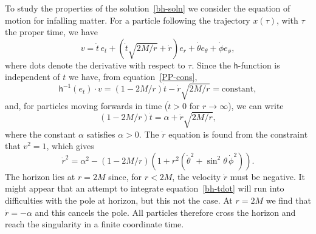 \documentclass[a4paper]{article}
\numberwithin{equation}{section}
\newcommand{\dt}{\! \cdot \!}
\newcommand{\rdot}{\dot{r}}
\newcommand{\tdot}{\dot{t}}
\newcommand{\thetadot}{\dot{\theta}}
\newcommand{\phidot}{\dot{\phi}}
\newcommand{\lih}{\mathsf{h}}
\newcommand{\hu}{\lih}
\begin{document}
To study the properties of the solution~\eqref{bh-soln} we consider the
equation of motion for infalling matter.  For a particle following the
trajectory $x(\tau)$, with $\tau$ the proper time, we have
%
\begin{equation}
v = \tdot \, e_t + (\tdot \sqrt{2M/r} + \rdot) e_r + \thetadot
e_\theta + \phidot e_\phi,
\end{equation}
%
where dots denote the derivative with respect to $\tau$.  Since the
$\lih$-function is independent of $t$ we have, from
equation~\eqref{PP-cons},
%
\begin{equation}
\hu^{-1}(e_t) \dt v = (1-2M/r) \tdot - \rdot \sqrt{2M/r} =
\mbox{constant} ,
\end{equation} 
%
and, for particles moving forwards in time ($\tdot>0$ for
$r\rightarrow\infty$), we can write
%
\begin{equation}
(1-2M/r) \tdot = \alpha + \rdot \sqrt{2M/r},
\label{bh-tdot}
\end{equation}
%
where the constant $\alpha$ satisfies $\alpha >0$.  The $\rdot$
equation is found from the constraint that $v^2=1$, which gives
%
\begin{equation}
\rdot^2 = \alpha^2 - (1-2M/r)(1 + r^2 (\thetadot^2 +
\sin^2\!\theta \, \phidot^2)).
\label{bh-rdot}
\end{equation} 
%
The horizon lies at $r=2M$ since, for $r<2M$, the velocity $\rdot$
must be negative. It might appear that an attempt to integrate
equation~\eqref{bh-tdot} will run into difficulties with the pole at
horizon, but this not the case.  At $r=2M$ we find that
$\rdot=-\alpha$ and this cancels the pole.  All particles therefore
cross the horizon and reach the singularity in a finite coordinate
time.
\end{document}
